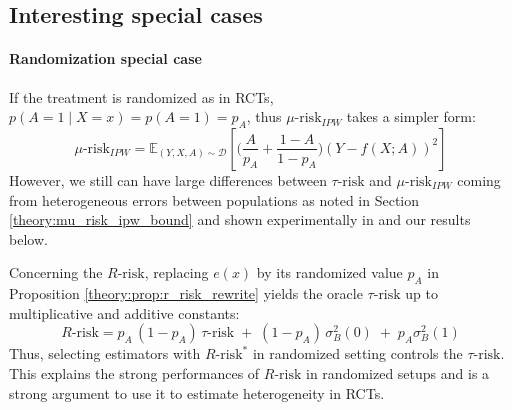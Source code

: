 \documentclass[french,12pt,twoside,a4paper]{book}
\begin{document}


\subsection{Interesting special cases}

\paragraph{Randomization special case}\label{remark:rct} If the treatment is
randomized as in RCTs, $p(A=1 \mid X=x) = p(A=1)=p_A$, thus
$\mu\text{-risk}_{IPW}$ takes a simpler form:
\begin{equation*}
  \mu\text{-risk}_{IPW} = \mathbb{E}_{(Y, X, A) \sim \mathcal D}\left[ \Big( \frac{A}{p_A} + \frac{1-A}{1-p_A} \Big) (Y-f(X ; A))^2 \right]
\end{equation*}
However, we still can have large differences
between $\tau\text{-risk}$ and $\mu\text{-risk}_{IPW}$ coming from heterogeneous
errors between populations as noted in Section \ref{theory:mu_risk_ipw_bound}
and shown experimentally in \citet{schuler_comparison_2018} and our
results below.

Concerning the $R\text{-risk}$, replacing $e(x)$ by its randomized value $p_A$
in Proposition \ref{theory:prop:r_risk_rewrite} yields the oracle
$\tau\text{-risk}$ up to multiplicative and additive constants:
\begin{equation*}
  R\text{-risk} = p_A \, (1-p_A) \, \tau\text{-risk} \;+\; (1 - p_A) \,\sigma_B^2(0) \;+\; p_A \sigma_B^2(1)
\end{equation*}
Thus, selecting estimators with $R\text{-risk}^*$ in
randomized setting controls the $\tau\text{-risk}$. This explains
the strong performances of $R\text{-risk}$ in randomized setups
\citep{schuler_comparison_2018} and is a strong argument to use it
to estimate heterogeneity in RCTs.
\end{document}
